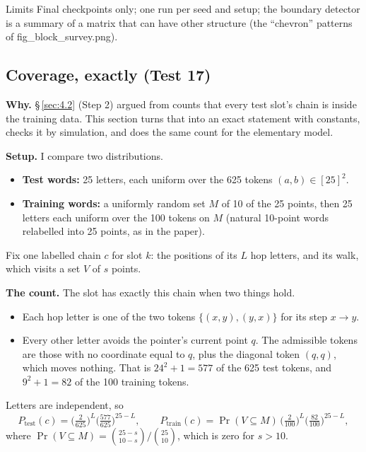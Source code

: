 \documentclass[paper=a4,fontsize=11pt,DIV=11,parskip=half,headings=small,numbers=noendperiod]{scrartcl}
\DeclareRobustCommand{\lead}[1]{\textsf{\bfseries\color{accent}#1}}
\DeclareRobustCommand{\code}[1]{{\fontseries{m}\ttfamily #1}}
\begin{document}
\begin{limbox}{Limits}
Final checkpoints only; one run per seed and setup; the boundary detector is a summary of a matrix that can have
other structure (the “chevron” patterns of
\code{fig\_\allowbreak{}block\_\allowbreak{}survey.\allowbreak{}png}).
\end{limbox}

\subsection{Coverage, exactly (Test 17)}\label{sec:3.19}
\lead{Why.} \S\,\ref{sec:4.2} (Step 2) argued from counts that every test slot’s chain is inside the training
data. This section turns that into an exact statement with constants, checks it by simulation, and does the same
count for the elementary model.

\lead{Setup.} I compare two distributions.

\begin{itemize}
\item \lead{Test words:} 25 letters, each uniform over the 625 tokens $(a,b)\in[25]^2$.
\item \lead{Training words:} a uniformly random set $M$ of 10 of the 25 points, then 25 letters each uniform
  over the 100 tokens on $M$ (natural 10-point words relabelled into 25 points, as in the paper).
\end{itemize}

Fix one labelled chain $c$ for slot $k$: the positions of its $L$ hop letters, and its walk, which visits a set
$V$ of $s$ points.

\lead{The count.} The slot has exactly this chain when two things hold.

\begin{itemize}
\item Each hop letter is one of the two tokens $\{(x,y),(y,x)\}$ for its step $x\to y$.
\item Every other letter avoids the pointer’s current point $q$. The admissible tokens are those with no
  coordinate equal to $q$, plus the diagonal token $(q,q)$, which moves nothing. That is $24^2+1=577$ of the 625
  test tokens, and $9^2+1=82$ of the 100 training tokens.
\end{itemize}

Letters are independent, so
\[ P_{\text{test}}(c)=\Big(\tfrac{2}{625}\Big)^{L}\Big(\tfrac{577}{625}\Big)^{25-L},\qquad
P_{\text{train}}(c)=\Pr(V\subseteq M)\,\Big(\tfrac{2}{100}\Big)^{L}\Big(\tfrac{82}{100}\Big)^{25-L}, \]
where $\Pr(V\subseteq M)=\binom{25-s}{10-s}\big/\binom{25}{10}$, which is zero for $s>10$.
\end{document}
